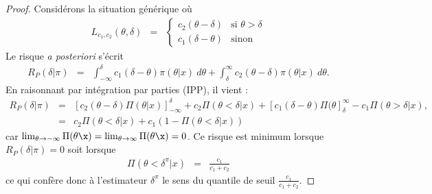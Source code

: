 \begin{proof}%
Considérons la situation générique où 
\begin{eqnarray}
L_{c_1,c_2}(\theta,\delta) & = & \left\{\begin{array}{ll} c_2(\theta-\delta) & \text{si $\theta>\delta$} \\ c_1(\delta-\theta) & \text{sinon} 
\end{array} \right. \label{cout.lin}
\end{eqnarray}
Le risque {\it a posteriori} s'écrit
\begin{eqnarray*}
R_P(\delta|\pi) & = & \int_{-\infty}^\delta c_1(\delta-\theta)\pi(\theta|x) \ d\theta +  \int_{\delta}^{\infty} c_2(\theta-\delta)\pi(\theta|x) \ d\theta.
\end{eqnarray*}
En raisonnant par intégration par parties (IPP), il vient :
\begin{eqnarray*}
R_P(\delta|\pi) & = & \left[c_2(\theta-\delta) \Pi(\theta|x)\right]^{\delta}_{-\infty} + c_2 \Pi(\theta<\delta|x) +   
\left[c_1(\delta-\theta) \Pi(\theta\right]^{\infty}_{\delta} - c_1\Pi(\theta>\delta|x), \\
& = & c_2 \Pi(\theta<\delta|x) + c_1\left(1-\Pi(\theta<\delta|x)\right)
\end{eqnarray*}
car $\lim_{\theta\to-\infty} \Pi(\theta\x) = \lim_{\theta\to\infty} \Pi(\theta\x) = 0$. 
Ce risque est minimum lorsque $R_P(\delta|\pi)=0$ soit lorsque
\begin{eqnarray*}
\Pi(\theta<\delta^{\pi}|x) & = & \frac{c_1}{c_1+c_2}
\end{eqnarray*}
 ce qui confère donc à l'estimateur $\delta^{\pi}$ le sens du quantile de seuil  $\frac{c_1}{c_1+c_2}$.
\end{proof}